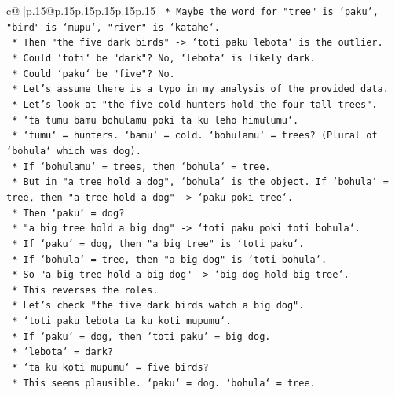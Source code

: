 \documentclass{article}
\begin{document}
{\begin{supertabular}{c@{$\;$}|p{.15\linewidth}@{}p{.15\linewidth}p{.15\linewidth}p{.15\linewidth}p{.15\linewidth}p{.15\linewidth}}
{{{\texttt{            *   Maybe the word for "tree" is `paku`, "bird" is `mupu`, "river" is `katahe`.} \\
\texttt{            *   Then "the five dark birds" {-}> `toti paku lebota` is the outlier.} \\
\texttt{            *   Could `toti` be "dark"? No, `lebota` is likely dark.} \\
\texttt{            *   Could `paku` be "five"? No.} \\
\texttt{            *   Let's assume there is a typo in my analysis of the provided data.} \\
\texttt{            *   Let's look at "the five cold hunters hold the four tall trees".} \\
\texttt{            *   `ta tumu bamu bohulamu poki ta ku leho himulumu`.} \\
\texttt{            *   `tumu` = hunters. `bamu` = cold. `bohulamu` = trees? (Plural of `bohula` which was dog).} \\
\texttt{            *   If `bohulamu` = trees, then `bohula` = tree.} \\
\texttt{            *   But in "a tree hold a dog", `bohula` is the object. If `bohula` = tree, then "a tree hold a dog" {-}> `paku poki tree`.} \\
\texttt{            *   Then `paku` = dog?} \\
\texttt{            *   "a big tree hold a big dog" {-}> `toti paku poki toti bohula`.} \\
\texttt{            *   If `paku` = dog, then "a big tree" is `toti paku`.} \\
\texttt{            *   If `bohula` = tree, then "a big dog" is `toti bohula`.} \\
\texttt{            *   So "a big tree hold a big dog" {-}> `big dog hold big tree`.} \\
\texttt{            *   This reverses the roles.} \\
\texttt{            *   Let's check "the five dark birds watch a big dog".} \\
\texttt{            *   `toti paku lebota ta ku koti mupumu`.} \\
\texttt{            *   If `paku` = dog, then `toti paku` = big dog.} \\
\texttt{            *   `lebota` = dark?} \\
\texttt{            *   `ta ku koti mupumu` = five birds?} \\
\texttt{            *   This seems plausible. `paku` = dog. `bohula` = tree.} \\
}}}
\end{supertabular}}
\end{document}
